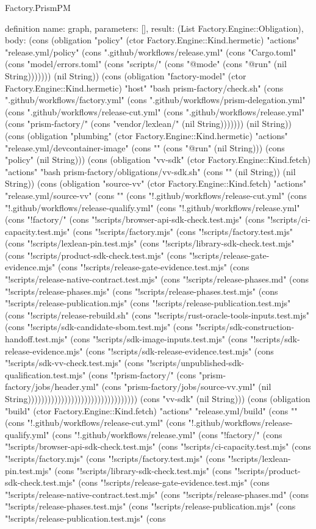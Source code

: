 \begin{lexlean}{Factory.PrismPM}
\begin{semanticmodule}
definition{
  name: graph,
  parameters: [],
  result: (List Factory.Engine::Obligation),
  body: (cons (obligation "policy" (ctor Factory.Engine::Kind.hermetic) "actions" "release.yml/policy" (cons ".github/workflows/release.yml" (cons "Cargo.toml" (cons "model/errors.toml" (cons "scripts/" (cons "@mode" (cons "@run" (nil String))))))) (nil String)) (cons (obligation "factory-model" (ctor Factory.Engine::Kind.hermetic) "host" "bash prism-factory/check.sh" (cons ".github/workflows/factory.yml" (cons ".github/workflows/prism-delegation.yml" (cons ".github/workflows/release-cut.yml" (cons ".github/workflows/release.yml" (cons "prism-factory/" (cons "vendor/lexlean/" (nil String))))))) (nil String)) (cons (obligation "plumbing" (ctor Factory.Engine::Kind.hermetic) "actions" "release.yml/devcontainer-image" (cons "" (cons "@run" (nil String))) (cons "policy" (nil String))) (cons (obligation "vv-sdk" (ctor Factory.Engine::Kind.fetch) "actions" "bash prism-factory/obligations/vv-sdk.sh" (cons "" (nil String)) (nil String)) (cons (obligation "source-vv" (ctor Factory.Engine::Kind.fetch) "actions" "release.yml/source-vv" (cons "" (cons "!.github/workflows/release-cut.yml" (cons "!.github/workflows/release-qualify.yml" (cons "!.github/workflows/release.yml" (cons "!factory/" (cons "!scripts/browser-api-sdk-check.test.mjs" (cons "!scripts/ci-capacity.test.mjs" (cons "!scripts/factory.mjs" (cons "!scripts/factory.test.mjs" (cons "!scripts/lexlean-pin.test.mjs" (cons "!scripts/library-sdk-check.test.mjs" (cons "!scripts/product-sdk-check.test.mjs" (cons "!scripts/release-gate-evidence.mjs" (cons "!scripts/release-gate-evidence.test.mjs" (cons "!scripts/release-native-contract.test.mjs" (cons "!scripts/release-phases.md" (cons "!scripts/release-phases.mjs" (cons "!scripts/release-phases.test.mjs" (cons "!scripts/release-publication.mjs" (cons "!scripts/release-publication.test.mjs" (cons "!scripts/release-rebuild.sh" (cons "!scripts/rust-oracle-tools-inputs.test.mjs" (cons "!scripts/sdk-candidate-sbom.test.mjs" (cons "!scripts/sdk-construction-handoff.test.mjs" (cons "!scripts/sdk-image-inputs.test.mjs" (cons "!scripts/sdk-release-evidence.mjs" (cons "!scripts/sdk-release-evidence.test.mjs" (cons "!scripts/sdk-vv-check.test.mjs" (cons "!scripts/unpublished-sdk-qualification.test.mjs" (cons "!prism-factory/" (cons "prism-factory/jobs/header.yml" (cons "prism-factory/jobs/source-vv.yml" (nil String))))))))))))))))))))))))))))))))) (cons "vv-sdk" (nil String))) (cons (obligation "build" (ctor Factory.Engine::Kind.fetch) "actions" "release.yml/build" (cons "" (cons "!.github/workflows/release-cut.yml" (cons "!.github/workflows/release-qualify.yml" (cons "!.github/workflows/release.yml" (cons "!factory/" (cons "!scripts/browser-api-sdk-check.test.mjs" (cons "!scripts/ci-capacity.test.mjs" (cons "!scripts/factory.mjs" (cons "!scripts/factory.test.mjs" (cons "!scripts/lexlean-pin.test.mjs" (cons "!scripts/library-sdk-check.test.mjs" (cons "!scripts/product-sdk-check.test.mjs" (cons "!scripts/release-gate-evidence.test.mjs" (cons "!scripts/release-native-contract.test.mjs" (cons "!scripts/release-phases.md" (cons "!scripts/release-phases.test.mjs" (cons "!scripts/release-publication.mjs" (cons "!scripts/release-publication.test.mjs" (cons }
\end{semanticmodule}
\end{lexlean}
